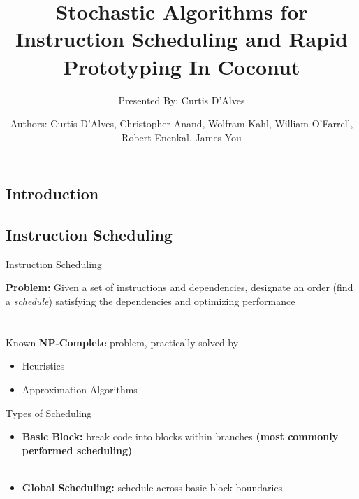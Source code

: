 \documentclass{beamer}
\title{\normalsize Stochastic Algorithms for Instruction Scheduling and Rapid Prototyping In Coconut} %
\subtitle{Presented By: Curtis D'Alves} %
\author{Authors: Curtis D'Alves, Christopher Anand, Wolfram Kahl, William
  O'Farrell, Robert Enenkal, James You}
\begin{document}
  \frame{\maketitle}


  \begin{darkframes}

    \section{Introduction}

    \subsection{Instruction Scheduling}
    \begin{frame}{Instruction Scheduling}
      
      \alert{ \bf Problem:} Given a set of instructions and dependencies, designate an order (find a {\it schedule}) satisfying the dependencies and optimizing performance
      \qquad \\
      \qquad \\
      \qquad \\
      Known {\bf \color{green} NP-Complete} problem, practically solved by
      \begin{itemize}
      \item Heuristics
      \item Approximation Algorithms
      \end{itemize}
    \end{frame}
    
    \begin{frame}{Types of Scheduling}

      \begin{itemize}
      \item {\bf \color{green} Basic Block:} break code into blocks within branches {\bf \alert{(most commonly performed scheduling)}} \\
        \qquad \\

      \item {\bf \color{green} Global Scheduling:} schedule across basic block boundaries \\
        \qquad \\


\end{itemize}
\end{frame}
\end{darkframes}
\end{document}
